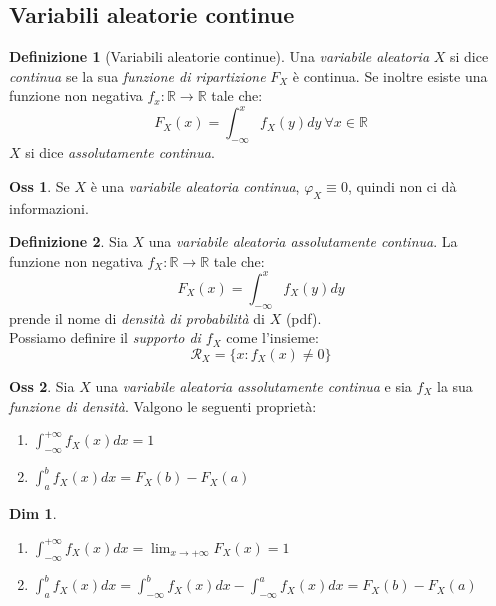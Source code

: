 \documentclass[12pt, a4paper]{report}
\theoremstyle{definition}
\newtheorem{definition}{Definizione}[section]
\newtheorem*{demonstration}{Dim}
\newtheorem*{observation}{Oss}
\DeclareRobustCommand{\R}{\mathbb{R}}%
\DeclareRobustCommand{\supp}{\mathcal{R}}%
\begin{document}
\subsection{Variabili aleatorie continue}
\begin{definition}[Variabili aleatorie continue]
	Una \emph{variabile aleatoria} $X$ si dice \emph{continua} se la sua \emph{
	funzione di ripartizione} $F_X$ è continua. Se inoltre esiste una funzione
	non	negativa \(f_x:\R\rightarrow\R\) tale che:
	\[F_X(x)=\int_{-\infty}^{x}f_X(y)dy\ \forall x\in\R\]
	$X$ si dice \emph{assolutamente continua}.
\end{definition}

\begin{observation}
	Se $X$ è una \emph{variabile aleatoria continua}, \(\varphi_X\equiv 0\),
	quindi non ci dà informazioni.
\end{observation}

\begin{definition}
	Sia $X$ una \emph{variabile aleatoria assolutamente continua}. La funzione
	non negativa \(f_X:\R\rightarrow\R\) tale che:
	\[F_X(x)=\int_{-\infty}^{x}f_X(y)dy\]
	prende il nome di \emph{densità di probabilità} di $X$ (pdf).\\
	Possiamo definire il \emph{supporto di $f_X$} come l'insieme:
	\[\supp_X=\{x:f_X(x)\neq 0\}\]
\end{definition}

\begin{observation}
	Sia $X$ una \emph{variabile  aleatoria  assolutamente continua} e sia $f_X$
	la  sua \emph{funzione  di  densità}. Valgono  le seguenti proprietà:
	\begin{enumerate}[label=(\roman*)]
		\item \(\int_{-\infty}^{+\infty}f_X(x)dx=1\)
		\item \(\int_{a}^{b}f_X(x)dx=F_X(b)-F_X(a)\)
	\end{enumerate}
\end{observation}

\begin{demonstration}
	\mbox{}
	\begin{enumerate}[label=(\roman*)]
		\item \(\int_{-\infty}^{+\infty}f_X(x)dx=\lim_{x\rightarrow +\infty}F_X(x)=1\)
		\item \(\int_{a}^{b}f_X(x)dx=\int_{-\infty}^{b}f_X(x)dx - \int_{-\infty}
		^{a}f_X(x)dx=F_X(b)-F_X(a)\)
	\end{enumerate}
\end{demonstration}
\end{document}
